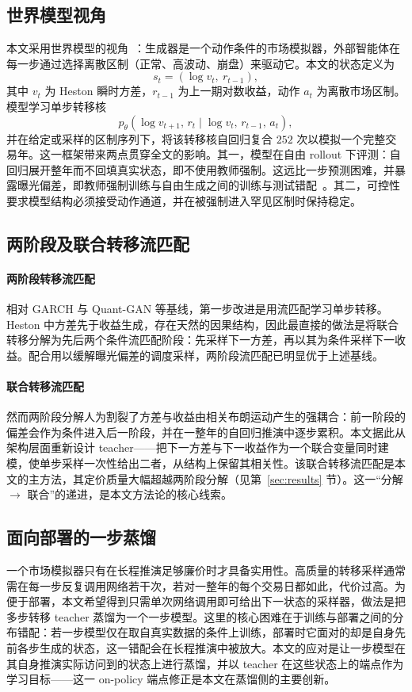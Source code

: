 \documentclass[11pt]{ctexart}
\begin{document}
\subsection{世界模型视角}
本文采用世界模型的视角~\citep{ha2018world,alonso2024diamond}：生成器是一个动作条件的市场模拟器，外部智能体在每一步通过选择离散区制（正常、高波动、崩盘）来驱动它。本文的状态定义为
\[
s_t=(\log v_t,\ r_{t-1}),
\]
其中 $v_t$ 为 Heston 瞬时方差，$r_{t-1}$ 为上一期对数收益，动作 $a_t$ 为离散市场区制。模型学习单步转移核
\[
p_\theta(\log v_{t+1},\,r_t\mid \log v_t,\,r_{t-1},\,a_t),
\]
并在给定或采样的区制序列下，将该转移核自回归复合 $252$ 次以模拟一个完整交易年。这一框架带来两点贯穿全文的影响。其一，模型在自由 rollout 下评测：自回归展开整年而不回填真实状态，即不使用教师强制。这远比一步预测困难，并暴露曝光偏差，即教师强制训练与自由生成之间的训练与测试错配~\citep{bengio2015scheduled}。其二，可控性要求模型结构必须接受动作通道，并在被强制进入罕见区制时保持稳定。

\subsection{两阶段及联合转移流匹配}
\label{sec:progressive}

\paragraph{两阶段转移流匹配}
相对 GARCH 与 Quant-GAN 等基线，第一步改进是用流匹配学习单步转移。Heston 中方差先于收益生成，存在天然的因果结构，因此最直接的做法是将联合转移分解为先后两个条件流匹配阶段：先采样下一方差，再以其为条件采样下一收益。配合用以缓解曝光偏差的调度采样，两阶段流匹配已明显优于上述基线。

\paragraph{联合转移流匹配}
然而两阶段分解人为割裂了方差与收益由相关布朗运动产生的强耦合：前一阶段的偏差会作为条件进入后一阶段，并在一整年的自回归推演中逐步累积。本文据此从架构层面重新设计 teacher——把下一方差与下一收益作为一个联合变量同时建模，使单步采样一次性给出二者，从结构上保留其相关性。该联合转移流匹配是本文的主方法，其定价质量大幅超越两阶段分解（见第~\ref{sec:results} 节）。这一“分解 $\to$ 联合”的递进，是本文方法论的核心线索。

\subsection{面向部署的一步蒸馏}
一个市场模拟器只有在长程推演足够廉价时才具备实用性。高质量的转移采样通常需在每一步反复调用网络若干次，若对一整年的每个交易日都如此，代价过高。为便于部署，本文希望得到只需单次网络调用即可给出下一状态的采样器，做法是把多步转移 teacher 蒸馏为一个一步模型。这里的核心困难在于训练与部署之间的分布错配：若一步模型仅在取自真实数据的条件上训练，部署时它面对的却是自身先前各步生成的状态，这一错配会在长程推演中被放大。本文的应对是让一步模型在其自身推演实际访问到的状态上进行蒸馏，并以 teacher 在这些状态上的端点作为学习目标——这一 on-policy 端点修正是本文在蒸馏侧的主要创新。
\end{document}
